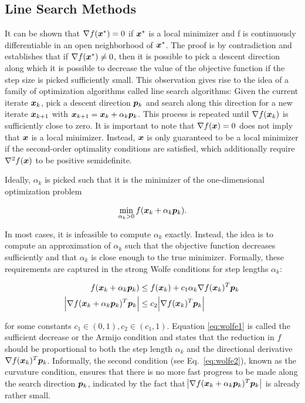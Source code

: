 \subsection{Line Search Methods}\label{ss:line-search}
It can be shown that $\nabla f(\bm{x}^*) = 0$ if $\bm{x}^*$ is a local minimizer and f is continuously differentiable in an open neighborhood
of $\bm{x}^*$. The proof is by contradiction and establishes that if $\nabla f(\bm{x}^*) \neq 0$, then it is possible to pick a descent 
direction along which it is possible to decrease the value of the objective function if the step size is picked sufficiently small. This 
observation gives rise to the idea of a family of optimization algorithms called line search algorithms: Given the current 
iterate $\bm{x}_k$, pick a descent direction $\bm{p}_k$ and search along this direction for a new iterate $\bm{x}_{k+1}$ with $\bm{x}_{k+1} = 
\bm{x}_k + \alpha_k \bm{p}_k$. This process is repeated until $\nabla f(\bm{x}_k)$ is sufficiently close to zero. It is important to note that 
$\nabla f(\bm{x}) = 0$ does not imply that $\bm{x}$ is a local minimizer. Instead, $\bm{x}$ is only guaranteed to be a local minimizer if 
the second-order 
optimality conditions are satisfied, which additionally require $\nabla^2 f(\bm{x})$ to be positive semidefinite.

Ideally, $\alpha_k$ is picked such that it is the minimizer of the one-dimensional optimization problem

\[
    \min_{\alpha_k > 0} f(\bm{x}_k + \alpha_k \bm{p}_k).
\]

\noindent In most cases, it is infeasible to compute $\alpha_k$ exactly. Instead, the idea is to compute an approximation of $\alpha_k$ such that 
the objective function decreases sufficiently and that $\alpha_k$ is close enough to the true minimizer. Formally, these requirements
are captured in the strong Wolfe conditions for step lengths $\alpha_k$:

\begin{align}
    f(\bm{x}_k + \alpha_k \bm{p}_k) &\leq f(\bm{x}_k) + c_1 \alpha_k \nabla f(\bm{x}_k)^T \bm{p}_k \label{eq:wolfe1} \\
    \abs{\nabla f(\bm{x}_k + \alpha_k \bm{p}_k)^T \bm{p}_k} &\leq c_2 \abs{\nabla f(\bm{x}_k)^T \bm{p}_k} \label{eq:wolfe2}
\end{align}

\noindent for some constants $c_1 \in (0, 1), c_2 \in (c_1, 1)$. Equation \ref{eq:wolfe1} is called the sufficient decrease or the Armijo condition 
and states that the reduction in $f$ should be proportional to both the step length $\alpha_k$ and the directional derivative 
$\nabla f(\bm{x}_k)^T \bm{p}_k$. Informally, the second condition (see Eq.\ \ref{eq:wolfe2}), known as the curvature condition, ensures that there 
is no more fast 
progress to be made along the search direction $\bm{p}_k$, indicated by the fact that $\abs{\nabla f(\bm{x}_k + \alpha_k \bm{p}_k)^T
\bm{p}_k}$ is already rather small. 


